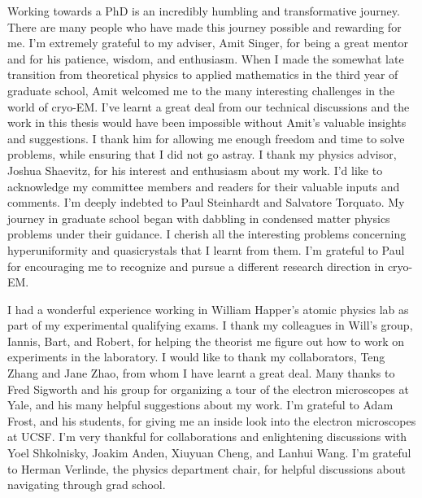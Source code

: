 Working towards a PhD is an incredibly humbling and transformative journey. There are many people who have made this journey possible and rewarding for me. I'm extremely grateful to my adviser, Amit Singer, for being a great mentor and for his patience, wisdom, and enthusiasm. When I made the somewhat late transition from theoretical physics to applied mathematics in the third year of graduate school, Amit welcomed me to the many interesting challenges in the world of cryo-EM. I've learnt a great deal from our technical discussions and the work in this thesis would have been impossible without Amit's valuable insights and suggestions. I thank him for allowing me enough freedom and time to solve problems, while ensuring that I did not go astray. I thank my physics advisor, Joshua Shaevitz, for his interest and enthusiasm about my work.
I'd like to acknowledge my committee members and readers for their valuable inputs and comments.
I'm deeply indebted to Paul Steinhardt and Salvatore Torquato. My journey in graduate school began with dabbling in condensed matter physics problems under their guidance. I cherish all the interesting problems concerning hyperuniformity and quasicrystals that I learnt from them. I'm grateful to Paul for encouraging me to recognize and pursue a different research direction in cryo-EM.

I had a wonderful experience working in William Happer's atomic physics lab as part of my experimental qualifying exams. I thank my colleagues in Will's group, Iannis, Bart, and Robert, for helping the theorist me figure out how to work on experiments in the laboratory.
I would like to thank my collaborators, Teng Zhang and Jane Zhao, from whom I have learnt a great deal. Many thanks to Fred Sigworth and his group for organizing a tour of the electron microscopes at Yale, and his many helpful suggestions about my work. I'm grateful to Adam Frost, and his students, for giving me an inside look into the electron microscopes at UCSF. I'm very thankful for collaborations and enlightening discussions with Yoel Shkolnisky, Joakim Anden, Xiuyuan Cheng, and Lanhui Wang. I'm grateful to Herman Verlinde, the physics department chair, for helpful discussions about navigating through grad school.

